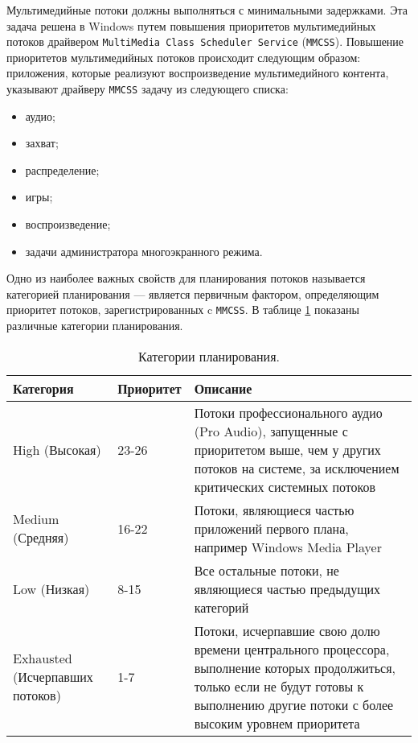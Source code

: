 Мультимедийные потоки должны выполняться с минимальными задержками. Эта задача решена в Windows путем повышения приоритетов мультимедийных потоков драйвером \texttt{MultiMedia Class Scheduler Service} (\texttt{MMCSS}). Повышение приоритетов мультимедийных потоков происходит следующим образом: приложения, которые реализуют воспроизведение мультимедийного контента, указывают драйверу \texttt{MMCSS} задачу из следующего списка:

\begin{itemize}
    \item аудио;
    \item захват;
    \item распределение;
    \item игры;
    \item воспроизведение;
    \item задачи администратора многоэкранного режима.
\end{itemize}

Одно из наиболее важных свойств для планирования потоков называется категорией планирования --- является первичным фактором, определяющим приоритет потоков, зарегистрированных c \texttt{MMCSS}. В таблице \ref{tab:plan} показаны различные категории планирования.

\begin{table}[h]
    \caption{Категории планирования.}
    \begin{center}
        \begin{tabular}{|p{40mm}|p{30mm}|p{80mm}|}
            \hline
            \textbf{Категория} & \textbf{Приоритет} & \textbf{Описание} \\
            \hline
            High (Высокая) & 23-26 & Потоки профессионального аудио (Pro Audio), запущенные с приоритетом выше, чем у других потоков на системе, за исключением критических системных потоков \\
            \hline
            Medium (Средняя) & 16-22 & Потоки, являющиеся частью приложений первого плана, например Windows Media Player \\
            \hline
            Low (Низкая) & 8-15 & Все остальные потоки, не являющиеся частью предыдущих категорий \\
            \hline
            Exhausted (Исчерпавших потоков) & 1-7 & Потоки, исчерпавшие свою долю времени центрального процессора, выполнение которых продолжиться, только если не будут готовы к выполнению другие потоки с более высоким уровнем приоритета \\
            \hline
        \end{tabular}
    \end{center}
    \label{tab:plan}
\end{table}

